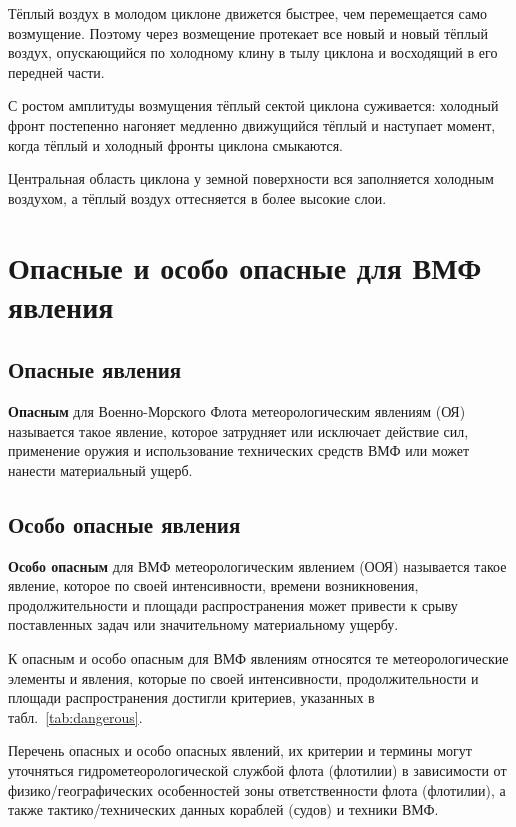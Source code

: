 \documentclass[a4paper, 12pt, twoside, draft, book, russian, fittopage, cyremdash, openright]{ncc}
\begin{document}
Тёплый воздух в молодом циклоне движется быстрее, чем перемещается
само возмущение. Поэтому через возмещение протекает все новый и новый
тёплый воздух, опускающийся по холодному клину в тылу циклона и
восходящий в его передней части.

С ростом амплитуды возмущения тёплый сектой циклона суживается:
холодный фронт постепенно нагоняет медленно движущийся тёплый и
наступает момент, когда тёплый и холодный фронты циклона смыкаются.

Центральная область циклона у земной поверхности вся заполняется
холодным воздухом, а тёплый воздух оттесняется в более высокие слои.

\section{Опасные и особо опасные для ВМФ явления}
\label{sec:dangerous}

\subsection{Опасные явления}

\textbf{Опасным} для Военно-Морского Флота метеорологическим явлениям
(ОЯ) называется такое явление, которое затрудняет или исключает
действие сил, применение оружия и использование технических средств
ВМФ или может нанести материальный ущерб.

\subsection{Особо опасные явления}

\textbf{Особо опасным} для ВМФ метеорологическим явлением (ООЯ)
называется такое явление, которое по своей интенсивности, времени
возникновения, продолжительности и площади распространения может
привести к срыву поставленных задач или значительному материальному
ущербу.

К опасным и особо опасным для ВМФ явлениям относятся те
метеорологические элементы и явления, которые по своей интенсивности,
продолжительности и площади распространения достигли критериев,
указанных в табл.~\ref{tab:dangerous}.

Перечень опасных и особо опасных явлений, их критерии и термины могут
уточняться гидрометеорологической службой флота (флотилии) в
зависимости от физико\-/географических особенностей зоны ответственности
флота (флотилии), а также тактико\-/технических данных кораблей (судов)
и техники ВМФ.
\end{document}

